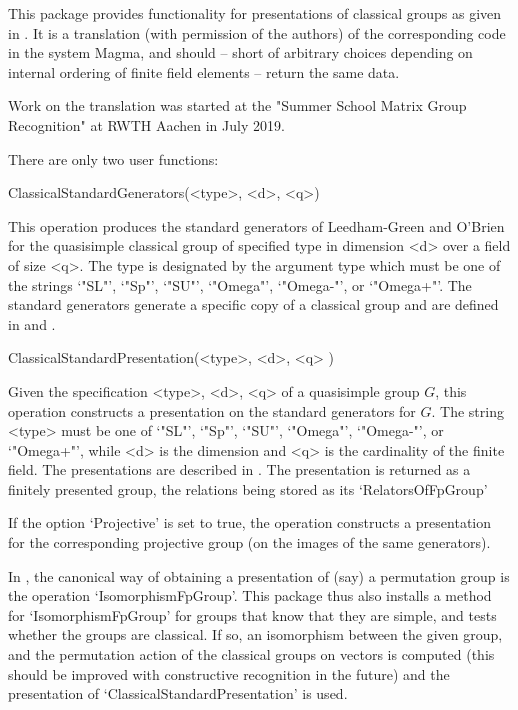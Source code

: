 %
%
%
%


This package provides functionality for presentations of classical groups
as given in \cite{lgo20}. It is a translation (with permission of the
authors) of the corresponding code in the system
Magma, and should -- short of arbitrary choices depending on internal
ordering of finite field elements -- return the same data.
\medskip

Work on the translation was started at the "Summer School
Matrix Group Recognition" at RWTH Aachen in July 2019.


There are only two user functions:

\>ClassicalStandardGenerators(<type>, <d>, <q>)

This operation produces the standard generators of Leedham-Green and O'Brien
for the quasisimple classical group of specified type in dimension <d> over a
field of size <q>. The type is designated by the argument type which must be
one of the strings `"SL"', `"Sp"', `"SU"', `"Omega"', `"Omega-"', or
`"Omega+"'. The
standard generators generate a specific copy of a classical group and are
defined in \cite{LGO09} and \cite{DLLGO13}.

\>ClassicalStandardPresentation(<type>, <d>, <q> )

Given the specification <type>, <d>, <q> of a quasisimple group $G$, this
operation constructs a presentation on the standard generators for $G$.
The string <type> must be one of `"SL"', `"Sp"', `"SU"', `"Omega"',
`"Omega-"', or `"Omega+"', while <d> is the dimension and <q> is the
cardinality of the finite field. The presentations are described in
\cite{LGO20}.
The presentation is returned as a finitely presented group, the relations
being stored as its `RelatorsOfFpGroup'

If the option `Projective' is set to true, the operation constructs a
presentation for the corresponding projective group (on the images of the
same generators).


In {\GAP}, the canonical way of obtaining a presentation of (say) a
permutation group is the operation `IsomorphismFpGroup'. This package thus
also installs a method for `IsomorphismFpGroup' for groups that know that
they are simple, and tests whether the groups are classical. If so, an
isomorphism between the given group, and the permutation action of the
classical groups on vectors is computed (this should be improved with
constructive recognition in the future) and the presentation of
`ClassicalStandardPresentation' is used.

